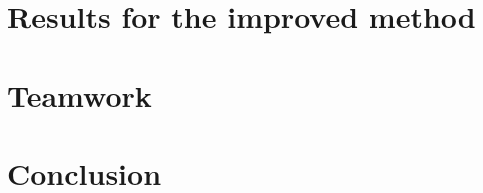 \documentclass{article}
\begin{document}
\section{Results for the improved method}



\section{Teamwork}



\section{Conclusion}



\pagebreak


\end{document}
